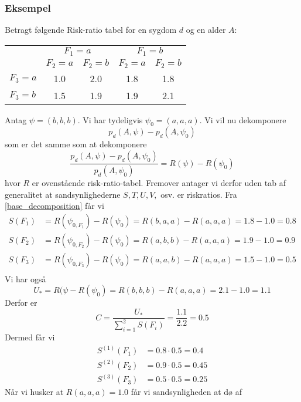 \documentclass[a4paper, 12pt]{memoir}
\begin{document}
\subsubsection{Eksempel}
Betragt følgende Risk-ratio tabel for en sygdom $d$ og en alder $A$:
\begin{center}
\begin{tabular}{|l|cc|cc|}
\hline
&\multicolumn{2}{c|}{$F_1=a$}&\multicolumn{2}{c|}{$F_1=b$}\\
&$F_2=a$&$F_2=b$& $F_2=a$& $F_2=b$\\
\hline
$F_3=a$ & 1.0 &2.0 & 1.8 & 1.8\\
$F_3=b$ & 1.5 &1.9 & 1.9 & 2.1\\
\hline
\end{tabular}
\end{center}
Antag $\psi=(b,b,b)$. Vi har tydeligvis $\psi_0=(a,a,a)$. Vi vil nu dekomponere
\begin{equation}
p_d(A, \psi)-p_d(A, \psi_0)
\end{equation}
som er det samme som at dekomponere
\begin{equation}
\frac{p_d(A, \psi)-p_d(A, \psi_0)}{p_d(A, \psi_0)}=R(\psi)-R(\psi_0)
\end{equation}
hvor $R$ er ovenstående risk-ratio-tabel. Fremover antager vi derfor uden tab af generalitet at sandsynlighederne $S, T, U, V, $ osv. er riskratios. Fra \eqref{base_decomposition} får vi
\begin{align*}
S(F_1)&=R(\psi_{0,F_1})-R(\psi_0)=R(b,a,a)-R(a,a,a)=1.8-1.0=0.8\\
S(F_2)&=R(\psi_{0,F_2})-R(\psi_0)=R(a,b,b)-R(a,a,a)=1.9-1.0=0.9\\
S(F_3)&=R(\psi_{0,F_3})-R(\psi_0)=R(a,a,b)-R(a,a,a)=1.5-1.0=0.5\\
\end{align*}
Vi har også
\begin{equation*}
U_*=R(\psi-R(\psi_0)=R(b,b,b)-R(a,a,a)=2.1-1.0=1.1
\end{equation*}
Derfor er 
\begin{equation*}
C=\frac{U_*}{\sum_{i=1}^2S(F_i)}=\frac{1.1}{2.2}=0.5
\end{equation*}
Dermed får vi 
\begin{align*}
S^{(1)}(F_1)&=0.8\cdot 0.5= 0.4\\
S^{(2)}(F_2)&=0.9\cdot 0.5=  0.45 \\
S^{(3)}(F_3)&=0.5\cdot 0.5 = 0.25
\end{align*}
Når vi husker at $R(a,a,a)=1.0$ får vi sandsynligheden at dø af 
\end{document}
